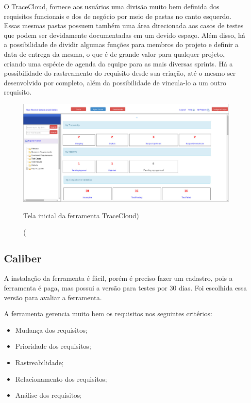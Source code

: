 O TraceCloud, fornece aos usuários uma divisão muito bem definida dos requisitos funcionais e dos de negócio por meio de pastas no canto esquerdo. Essas mesmas pastas possuem também uma área direcionada aos casos de testes que podem ser devidamente documentadas em um devido espaço. Além disso, há a possibilidade de dividir algumas funções para membros do projeto e definir a data de entrega da mesma, o que é de grande valor para qualquer projeto, criando uma espécie de agenda da equipe para as mais diversas sprints. Há a possibilidade do rastreamento do requisito desde sua criação, até o mesmo ser desenvolvido por completo, além da possibilidade de vincula-lo a um outro requisito.

\begin{figure}[!htb]
\centering
\includegraphics[scale=0.3]{figuras/trace.jpg}
\caption(Tela inicial da ferramenta TraceCloud)
\label{Rotulo}
\end{figure}

\subsection{Caliber}
A instalação da ferramenta é fácil, porém é preciso fazer um cadastro, pois a ferramenta é paga, mas possui a versão para testes por 30 dias. Foi escolhida essa versão para avaliar a ferramenta.

A ferramenta gerencia muito bem os requisitos nos seguintes critérios:
\begin{itemize}
  \item Mudança dos requisitos;
  \item Prioridade dos requisitos;
  \item Rastreabilidade;
  \item Relacionamento dos requisitos;
  \item Análise dos requisitos;
\end{itemize}

